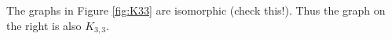 

\setcounter{section}{1}
\setcounter{subsection}{3}
\setcounter{dfn}{3}

\begin{exl}
The graphs in Figure \ref{fig:K33} are isomorphic (check this!).
Thus the graph on the right is also $K_{3,3}$.
\end{exl}


